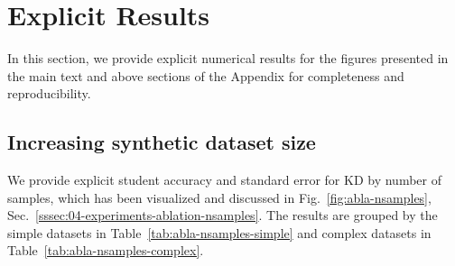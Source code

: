 \section{Explicit Results} \label{sec:app04-explicit}
\renewcommand{\thefigure}{D.\arabic{figure}}
\renewcommand{\thetable}{D.\arabic{table}}
\renewcommand{\theequation}{D.\arabic{equation}}
\setcounter{figure}{0}
\setcounter{table}{0}
\setcounter{equation}{0}


In this section, we provide explicit numerical results for the figures presented in the main text and above sections of the Appendix for completeness and reproducibility.


\subsection{Increasing synthetic dataset size} \label{ssec:app04-explicit-nsamples}
\begin{foldable}
    We provide explicit student accuracy and standard error for KD by number of samples, which has been visualized and discussed in Fig.~\ref{fig:abla-nsamples}, Sec.~\ref{sssec:04-experiments-ablation-nsamples}.
    The results are grouped by the simple datasets in Table~\ref{tab:abla-nsamples-simple} and complex datasets in Table~\ref{tab:abla-nsamples-complex}.
\end{foldable}

